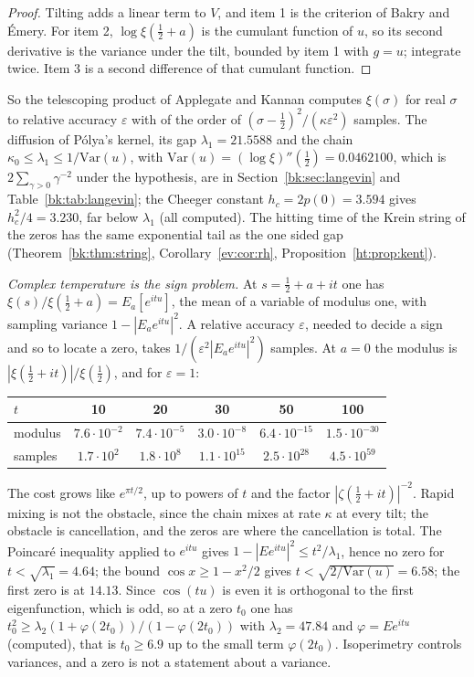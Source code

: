 \begin{proof}
Tilting adds a linear term to $V$, and item 1 is the criterion of Bakry and \'Emery. For item 2, $\log\xi(\frac12+a)$ is the cumulant function of $u$, so its second derivative is the variance under the tilt, bounded by item 1 with $g=u$; integrate twice. Item 3 is a second difference of that cumulant function.
\end{proof}

So the telescoping product of Applegate and Kannan \cite{AK91} computes $\xi(\sigma)$ for real $\sigma$ to relative accuracy $\varepsilon$ with of the order of $(\sigma-\frac12)^2/(\kappa\varepsilon^2)$ samples. The diffusion of P\'olya's kernel, its gap $\lambda_1=21.5588$ and the chain $\kappa_0\le\lambda_1\le1/\mathrm{Var}(u)$, with $\mathrm{Var}(u)=(\log\xi)''(\frac12)=0.0462100$, which is $2\sum_{\gamma>0}\gamma^{-2}$ under the hypothesis, are in Section~\ref{bk:sec:langevin} and Table~\ref{bk:tab:langevin}; the Cheeger constant $h_c=2p(0)=3.594$ gives $h_c^2/4=3.230$, far below $\lambda_1$ (all computed). The hitting time of the Krein string of the zeros has the same exponential tail as the one sided gap (Theorem~\ref{bk:thm:string}, Corollary~\ref{ev:cor:rh}, Proposition~\ref{ht:prop:kent}).

\emph{Complex temperature is the sign problem.} At $s=\frac12+a+it$ one has $\xi(s)/\xi(\frac12+a)=E_a[e^{itu}]$, the mean of a variable of modulus one, with sampling variance $1-|E_ae^{itu}|^2$. A relative accuracy $\varepsilon$, needed to decide a sign and so to locate a zero, takes $1/(\varepsilon^2|E_ae^{itu}|^2)$ samples. At $a=0$ the modulus is $|\xi(\frac12+it)|/\xi(\frac12)$, and for $\varepsilon=1$:
\begin{center}
\small
\begin{tabular}{lccccc}
\hline
$t$ & 10 & 20 & 30 & 50 & 100\\
\hline
modulus & $7.6\cdot10^{-2}$ & $7.4\cdot10^{-5}$ & $3.0\cdot10^{-8}$ & $6.4\cdot10^{-15}$ & $1.5\cdot10^{-30}$\\
samples & $1.7\cdot10^{2}$ & $1.8\cdot10^{8}$ & $1.1\cdot10^{15}$ & $2.5\cdot10^{28}$ & $4.5\cdot10^{59}$\\
\hline
\end{tabular}
\end{center}
The cost grows like $e^{\pi t/2}$, up to powers of $t$ and the factor $|\zeta(\frac12+it)|^{-2}$. Rapid mixing is not the obstacle, since the chain mixes at rate $\kappa$ at every tilt; the obstacle is cancellation, and the zeros are where the cancellation is total. The Poincar\'e inequality applied to $e^{itu}$ gives $1-|Ee^{itu}|^2\le t^2/\lambda_1$, hence no zero for $t<\sqrt{\lambda_1}=4.64$; the bound $\cos x\ge1-x^2/2$ gives $t<\sqrt{2/\mathrm{Var}(u)}=6.58$; the first zero is at $14.13$. Since $\cos(tu)$ is even it is orthogonal to the first eigenfunction, which is odd, so at a zero $t_0$ one has $t_0^2\ge\lambda_2(1+\varphi(2t_0))/(1-\varphi(2t_0))$ with $\lambda_2=47.84$ and $\varphi=Ee^{itu}$ (computed), that is $t_0\ge6.9$ up to the small term $\varphi(2t_0)$. Isoperimetry controls variances, and a zero is not a statement about a variance.

